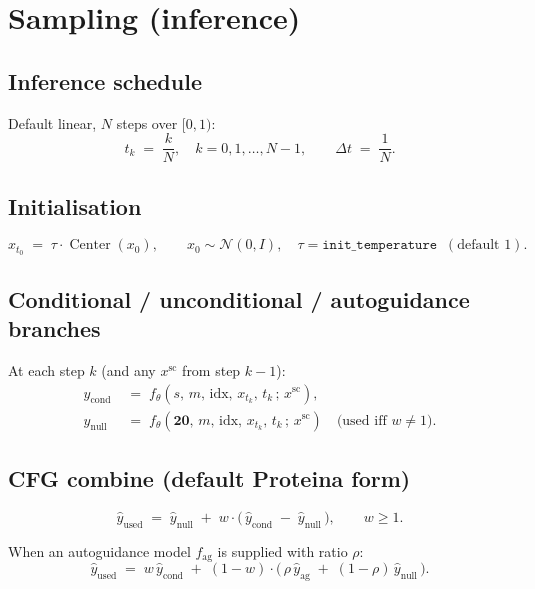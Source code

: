 \documentclass[11pt]{article}
\begin{document}
\section{Sampling (inference)}

\subsection{Inference schedule}
Default linear, $N$ steps over $[0, 1)$:
\begin{equation}
t_k \;=\; \frac{k}{N}, \quad k = 0, 1, \ldots, N-1, \qquad \Delta t \;=\; \frac{1}{N}.
\end{equation}

\subsection{Initialisation}
\begin{equation}
x_{t_0} \;=\; \tau \cdot \operatorname{Center}(x_0), \qquad x_0 \sim \mathcal{N}(0, I), \quad \tau = \texttt{init\_temperature} \;\;(\text{default }1).
\end{equation}

\subsection{Conditional / unconditional / autoguidance branches}
At each step $k$ (and any $x^{\text{sc}}$ from step $k-1$):
\begin{align}
\hat{y}_{\text{cond}} &\;=\; f_\theta(s,\, m,\, \text{idx},\, x_{t_k},\, t_k \,;\, x^{\text{sc}}), \\
\hat{y}_{\text{null}} &\;=\; f_\theta(\mathbf{20},\, m,\, \text{idx},\, x_{t_k},\, t_k \,;\, x^{\text{sc}}) \quad \text{(used iff $w \neq 1$)}.
\end{align}

\subsection{CFG combine (default Proteina form)}
\begin{equation}
\hat{y}_{\text{used}} \;=\; \hat{y}_{\text{null}} \;+\; w \cdot \big(\,\hat{y}_{\text{cond}} \;-\; \hat{y}_{\text{null}}\,\big), \qquad w \geq 1.
\end{equation}

When an autoguidance model $f_{\text{ag}}$ is supplied with ratio $\rho$:
\begin{equation}
\hat{y}_{\text{used}} \;=\; w\,\hat{y}_{\text{cond}} \;+\; (1-w) \cdot \big(\,\rho\,\hat{y}_{\text{ag}} \;+\; (1-\rho)\,\hat{y}_{\text{null}}\,\big).
\end{equation}
\end{document}
